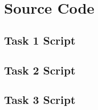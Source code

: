 \section{Source Code}

\subsection{Task 1 Script}



\pagebreak

\subsection{Task 2 Script}



\pagebreak

\subsection{Task 3 Script}


